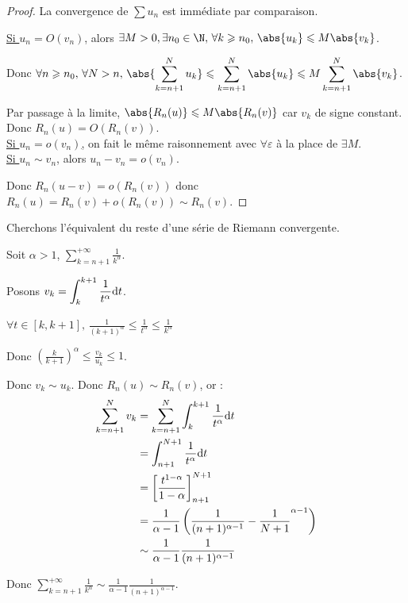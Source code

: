 \begin{proof}
    La convergence de $\sum u_n$ est immédiate par comparaison. 

    \uline{Si $u_n =  O(v_n)$}, alors $\exists M > 0, \exists n_0 \in \N, \, \forall k \geqslant n_0, \, \abs{u_k} \leqslant M \abs{v_k}$.

    Donc $\displaystyle \forall n \geqslant n_0, \, \forall N > n, \, \abs{\sum_{k = n + 1 }^{N } u_k} \leqslant \sum_{k = n + 1 }^{N } \abs{u_k} \leqslant M \sum_{k = n + 1}^{N } \abs{v_k}$.

    Par passage à la limite, $\abs{R_n(u)} \leqslant M \abs{R_n(v)}$ car $v_k$ de signe constant. 
    Donc $R_n(u) = O(R_n(v))$. \\

    \uline{Si $u_n = o(v_n)$,} 
    on fait le même raisonnement avec $\forall \varepsilon$ à la place de $\exists M$. \\

    \uline{Si $u_n \sim v_n$}, alors $u_n - v_n = o(v_n)$. 

    Donc $R_n(u - v) = o(R_n(v))$ donc $R_n(u) = R_n(v) + o(R_n(v)) \sim R_n(v)$.
\end{proof}

\begin{exemple}
    Cherchons l'équivalent du reste d'une série de Riemann convergente. 

    Soit $\alpha > 1$, $\displaystyle \sum_{k = n + 1}^{+ \infty } \frac 1 {k^\alpha}$.

    Posons $\displaystyle v_k = \int_k^{k + 1} \frac 1 {t^\alpha} \text d t$. 

    $\displaystyle \forall t \in [k, k + 1], \, \frac 1 {(k + 1)^\alpha} \leqslant \frac 1 {t^\alpha} \leqslant \frac 1 {k^\alpha}$

    Donc $\displaystyle \left( \frac k {k +  1} \right)^\alpha \leqslant \frac {v_k}{u_k} \leqslant 1$.

    Donc $v_k \sim u_k$.
    Donc $R_n(u) \sim R_n(v)$, or :
    \begin{align*}
        \sum_{k = n + 1 }^{N } v_k & = \sum_{k = n + 1}^{N } \int_k^{k + 1} \frac 1 {t^\alpha} \text d t \\
                                   & = \int_{n + 1}^{N + 1} \frac 1 {t^\alpha} \text d t \\
                                   & = \left[ \frac{t^{1 - \alpha}}{1 - \alpha} \right]_{n + 1}^{N + 1} \\
                                   & = \frac 1 {\alpha - 1} \left( \frac 1 {(n + 1)^{\alpha - 1}} - \frac 1 {N + 1}^{\alpha - 1} \right) \\
                                   & \sim \frac 1 {\alpha - 1} \frac 1 {(n + 1)^{\alpha - 1}} 
    \end{align*}

    Donc $\displaystyle \sum_{k = n + 1}^{+ \infty} \frac 1 {k^\alpha} \sim \frac 1 {\alpha - 1} \frac 1 {(n + 1)^{\alpha - 1}}$. \\
\end{exemple}     

